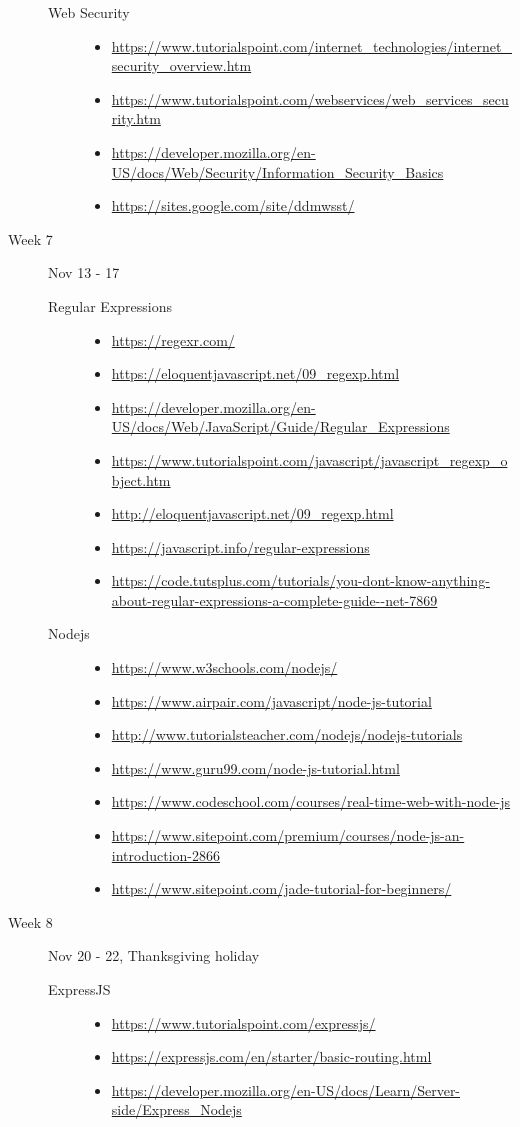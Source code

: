 \documentclass{article}
\newcommand{\myitem}[1]{\item{\scriptsize\url{#1}}}
\begin{document}
\begin{description}
\begin{description}
\item[Web Security]\mbox{}
  \begin{itemize}
  \myitem{https://www.tutorialspoint.com/internet_technologies/internet_security_overview.htm}
  \myitem{https://www.tutorialspoint.com/webservices/web_services_security.htm}
  \myitem{https://developer.mozilla.org/en-US/docs/Web/Security/Information_Security_Basics    }
  \myitem{https://sites.google.com/site/ddmwsst/}
  \end{itemize}

  \end{description}
\item[Week 7]  Nov 13 - 17
  \begin{description}
    
  \item[Regular Expressions]\mbox{}
    \begin{itemize}
      \myitem{https://regexr.com/}
      \myitem{https://eloquentjavascript.net/09_regexp.html}
      \myitem{https://developer.mozilla.org/en-US/docs/Web/JavaScript/Guide/Regular_Expressions}
      \myitem{https://www.tutorialspoint.com/javascript/javascript_regexp_object.htm}
      \myitem{http://eloquentjavascript.net/09_regexp.html}
      \myitem{https://javascript.info/regular-expressions}
      \myitem{https://code.tutsplus.com/tutorials/you-dont-know-anything-about-regular-expressions-a-complete-guide--net-7869}
    \end{itemize}

  \item[Nodejs]\mbox{}
    \begin{itemize}
      \myitem{https://www.w3schools.com/nodejs/}
      \myitem{https://www.airpair.com/javascript/node-js-tutorial}
      \myitem{http://www.tutorialsteacher.com/nodejs/nodejs-tutorials}
      \myitem{https://www.guru99.com/node-js-tutorial.html}
      \myitem{https://www.codeschool.com/courses/real-time-web-with-node-js}
      \myitem{https://www.sitepoint.com/premium/courses/node-js-an-introduction-2866}
      \myitem{https://www.sitepoint.com/jade-tutorial-for-beginners/}
    \end{itemize}
    
  \end{description}
\item[Week 8] Nov 20 - 22, Thanksgiving holiday
  \begin{description}
    
  \item[ExpressJS]\mbox{}
    \begin{itemize}
      \myitem{https://www.tutorialspoint.com/expressjs/}
      \myitem{https://expressjs.com/en/starter/basic-routing.html}
      \myitem{https://developer.mozilla.org/en-US/docs/Learn/Server-side/Express_Nodejs}
    \end{itemize}
    

\end{description}
\end{description}
\end{document}
